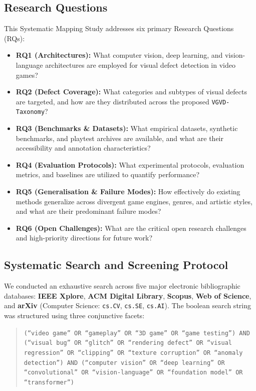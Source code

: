 \documentclass[preprint,12pt,3p]{elsarticle}
\begin{document}
\subsection{Research Questions}
This Systematic Mapping Study addresses six primary Research Questions (RQs):
\begin{itemize}
    \item \textbf{RQ1 (Architectures):} What computer vision, deep learning, and vision-language architectures are employed for visual defect detection in video games?
    \item \textbf{RQ2 (Defect Coverage):} What categories and subtypes of visual defects are targeted, and how are they distributed across the proposed \texttt{VGVD-Taxonomy}?
    \item \textbf{RQ3 (Benchmarks \& Datasets):} What empirical datasets, synthetic benchmarks, and playtest archives are available, and what are their accessibility and annotation characteristics?
    \item \textbf{RQ4 (Evaluation Protocols):} What experimental protocols, evaluation metrics, and baselines are utilized to quantify performance?
    \item \textbf{RQ5 (Generalisation \& Failure Modes):} How effectively do existing methods generalize across divergent game engines, genres, and artistic styles, and what are their predominant failure modes?
    \item \textbf{RQ6 (Open Challenges):} What are the critical open research challenges and high-priority directions for future work?
\end{itemize}

\subsection{Systematic Search and Screening Protocol}
We conducted an exhaustive search across five major electronic bibliographic databases: \textbf{IEEE Xplore}, \textbf{ACM Digital Library}, \textbf{Scopus}, \textbf{Web of Science}, and \textbf{arXiv} (Computer Science: \texttt{cs.CV}, \texttt{cs.SE}, \texttt{cs.AI}). The boolean search string was structured using three conjunctive facets:
\begin{quote}
\small
\texttt{(``video game'' OR ``gameplay'' OR ``3D game'' OR ``game testing'') AND (``visual bug'' OR ``glitch'' OR ``rendering defect'' OR ``visual regression'' OR ``clipping'' OR ``texture corruption'' OR ``anomaly detection'') AND (``computer vision'' OR ``deep learning'' OR ``convolutional'' OR ``vision-language'' OR ``foundation model'' OR ``transformer'')}
\end{quote}
\end{document}
